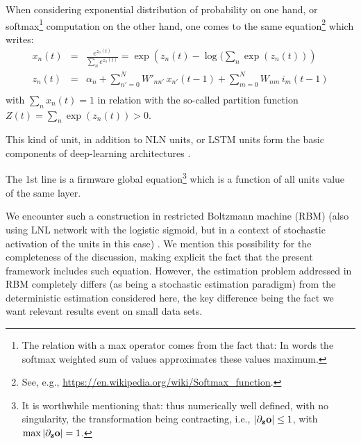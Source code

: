 When considering exponential distribution of probability on one hand, or softmax\footnote{
The relation with a max operator comes from the fact that:
In words the softmax weighted sum of values approximates these values maximum.} computation on the other hand, one comes to the same equation\footnote{See, e.g., \url{https://en.wikipedia.org/wiki/Softmax\_function}.} which writes: \begin{equation}\label{exp-network}\begin{array}{rcl}
x_n(t) &=& \frac{e^{z_n(t)}}{\sum_n e^{z_n(t)}} = \exp\left(z_n(t) - \log(\sum_n \exp\left(z_n(t)\right)\right) \\
z_n(t) &=& \alpha_n + \sum_{n' = 0}^{N} W'_{nn'} \, x_{n'}(t-1) + \sum_{m = 0}^{N} W_{nm} \, i_m(t-1) \\
\end{array} \end{equation} with $\sum_n x_n(t) = 1$ in relation with the so-called partition function $Z(t) = \sum_n \exp\left(z_n(t)\right) > 0$. 

This kind of unit, in addition to NLN units, or LSTM units form the basic components of deep-learning architectures \cite{Bengio:2009,Deng:2014}.

The 1st line is a firmware global equation\footnote{It is worthwhile mentioning that:
thus numerically well defined, with no singularity, the transformation being contracting, i.e., $\left|\partial_{{\bf z}} {\bf o}\right| \leq 1$, with $\max|\partial_{{\bf z}} {\bf o}|=1$.} which is a function of all units value of the same layer.

We encounter such a construction in restricted Boltzmann machine (RBM) (also using LNL network with the logistic sigmoid, but in a context of stochastic activation of the units in this case) \cite{Bengio:2009}. We mention this possibility for the completeness of the discussion, making explicit the fact that the present framework includes such equation. However, the estimation problem addressed in RBM completely differs (as being a stochastic estimation paradigm) from the deterministic estimation considered here, the key difference being the fact we want relevant results event on small data sets.

